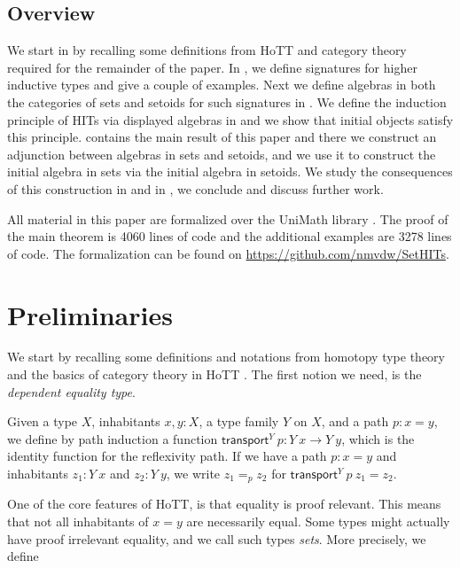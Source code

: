 \documentclass[9pt]{entcs}
\newcommand{\function}[1]{\mathsf{#1}}
\newcommand{\0}{\textbf{0}} %
\newcommand{\transport}[2]{\function{transport}^{#1} \> #2} %
\newcommand{\depeq}[3]{#2 =_{#1} #3} %
\begin{document}
\subsection{Overview}
We start in  by recalling some definitions from HoTT and category theory required for the remainder of the paper.
In , we define signatures for higher inductive types and give a couple of examples.
Next we define algebras in both the categories of sets and setoids for such signatures in .
We define the induction principle of HITs via displayed algebras in  and we show that initial objects satisfy this principle.
 contains the main result of this paper and there we construct an adjunction between algebras in sets and setoids, and we use it to construct the initial algebra in sets via the initial algebra in setoids.
We study the consequences of this construction in  and in , we conclude and discuss further work.

All material in this paper are formalized over the UniMath library \cite{UniMath}.
The proof of the main theorem is 4060 lines of code and the additional examples are 3278 lines of code.
The formalization can be found on \url{https://github.com/nmvdw/SetHITs}.

\section{Preliminaries}
\label{sec:prelim}
We start by recalling some definitions and notations from homotopy type theory and the basics of category theory in HoTT \cite{AhrensKS15,mac2013categories,hottbook}.
The first notion we need, is the \emph{dependent equality type}.

\begin{definition}
\label{def:depeq}
Given a type $X$, inhabitants $x, y : X$, a type family $Y$ on $X$, and a path $p : x = y$, we define by path induction a function $\transport{Y}{p} : Y \> x \rightarrow Y \> y$, which is the identity function for the reflexivity path. 
If we have a path $p : x = y$ and inhabitants $z_1 : Y \> x$ and $z_2 : Y \> y$, we write $\depeq{p}{z_1}{z_2}$ for $\transport{Y}{p} \ z_1 = z_2$.
\end{definition}

One of the core features of HoTT, is that equality is proof relevant.
This means that not all inhabitants of $x = y$ are necessarily equal.
Some types might actually have proof irrelevant equality, and we call such types \emph{sets}.
More precisely, we define
\end{document}
